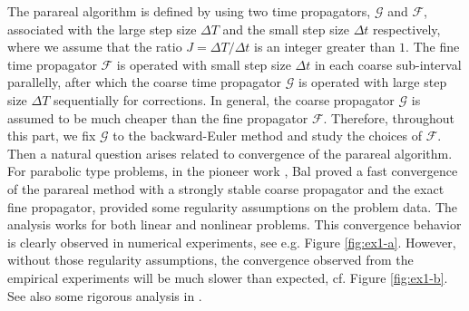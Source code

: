 \documentclass[a4paper, oneside]{book}
\begin{document}
The parareal algorithm is defined by
using two time propagators, $\mathcal{G}$ and $\mathcal{F}$,  associated with the large step size $\Delta T$ and the small step size $\Delta t$ respectively, where we assume that the ratio $J = \Delta T/\Delta t$ is an integer greater than $1$. The fine time propagator $\mathcal{F}$ is operated with small step size $\Delta t$ in each coarse sub-interval parallelly, after which the coarse time propagator $\mathcal{G}$ is operated with
large step size $\Delta T$ sequentially for corrections. 
In general, the coarse propagator  $\mathcal{G}$  is assumed to be much cheaper than the fine propagator $\mathcal{F}$.
Therefore, throughout this part, we fix $\mathcal{G}$ to the backward-Euler method and study the choices of $\mathcal{F}$.
Then a natural question arises related to convergence of the parareal algorithm.
For parabolic type problems,
in the pioneer work \cite{Bal:2005}, Bal proved a fast convergence of the parareal method with a strongly stable coarse propagator
and the exact fine propagator,
provided some regularity assumptions on the problem data. The analysis works for both linear and nonlinear problems.
This convergence behavior
is clearly observed in numerical experiments,
see e.g. Figure \ref{fig:ex1-a}.
However, without those regularity assumptions,
the convergence observed from
the empirical experiments will be much slower than expected,
cf. Figure \ref{fig:ex1-b}.
See also some rigorous analysis in
\cite{MR3716570, MR3948240, MR4242247}.

%
\end{document}
